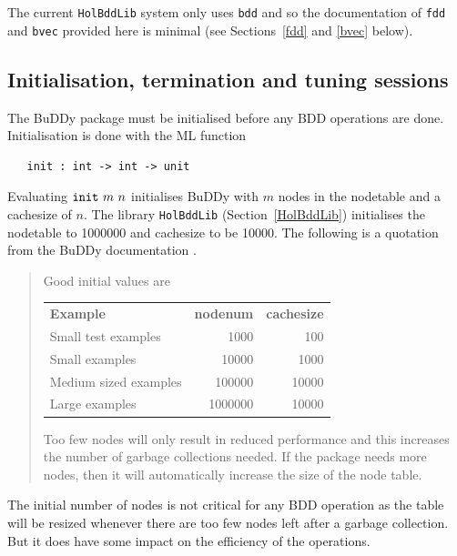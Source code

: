 \documentclass[12pt,fleqn]{article}
\renewcommand{\t}[1]{\mbox{\tt #1}}
\newcommand{\Buddy}{BuDDy{}}
\newcommand\HolBuddy{\texttt{HolBddLib}{}}
\begin{document}
The current \HolBuddy{} system only uses \t{bdd} and so
the documentation of \t{fdd} and \t{bvec} provided here is minimal
(see Sections~\ref{fdd} and \ref{bvec} below).

\subsection{Initialisation, termination and tuning sessions}\label{init}

The \Buddy{} package must be initialised before any BDD operations are done.
Initialisation is done with the ML function

\begin{verbatim}
   init : int -> int -> unit
\end{verbatim}

Evaluating $\t{init}~m~n$ initialises \Buddy{} with $m$ nodes in the
nodetable and a cachesize of $n$.  
The library \t{HolBddLib} (Section~\ref{HolBddLib}) 
initialises the nodetable to 1000000 and cachesize to
be 10000. The following is a quotation from the \Buddy{} documentation \cite{BuDDy}.

\vspace*{-2mm}

{\baselineskip8pt\begin{quote}\footnotesize
Good initial values are

\smallskip

\begin{tabular}{lrr}
{\bf Example} & {\bf nodenum} & {\bf cachesize} \\
Small test examples   & 1000    & 100\\
Small examples        & 10000   & 1000 \\
Medium sized examples & 100000  & 10000\\
Large examples        & 1000000 & 10000
\end{tabular}

\smallskip

Too few nodes will only result in reduced performance and this
increases the number of garbage collections needed. If the package
needs more nodes, then it will automatically increase the size of the
node table.
\end{quote}}

The initial number of nodes is not critical for any BDD operation
as the table will be resized whenever there are too few nodes left
after a garbage collection.  But it does have some impact on the
efficiency of the operations.
\end{document}
